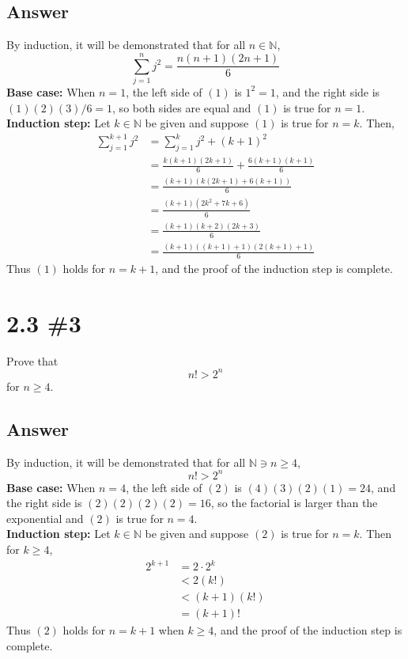 \documentclass[
	12pt, %
]{fphw}
\newcommand\qed{\text{$\blacksquare$}}
\newcommand\N{\mathbb{N}}
\begin{document}
\subsection*{Answer} By induction, it will be demonstrated that for all $n \in \N{}$,
\begin{equation} \label{eq1}
\sum_{j = 1}^n j^2 = \frac{n(n+1)(2n+1)}{6}
\end{equation}
\textbf{Base case:} When $n = 1$, the left side of $(1)$ is $1^2 = 1$, and the right side is $(1)(2)(3)/6 = 1$, so both sides are equal and $(1)$ is true for $n=1$.\\
\textbf{Induction step:} Let $k \in \N{}$ be given and suppose $(1)$ is true for $n = k$. Then,
\begin{align*}
\sum_{j = 1}^{k+1} j^2 &= \sum_{j = 1}^{k} j^2 + (k + 1)^2\\
&=\frac{k(k+1)(2k+1)}{6} + \frac{6(k + 1)(k + 1)}{6}\\
&=\frac{(k+1)(k(2k+1)+6(k+1))}{6}\\
&=\frac{(k+1)(2k^2+7k + 6)}{6}\\
&=\frac{(k+1)(k+2)(2k+3)}{6}\\
&=\frac{(k+1)((k+1)+1)(2(k+1) + 1)}{6}
\end{align*}
Thus $(1)$ holds for $n = k + 1$, and the proof of the induction step is complete. \qed
\newpage
\section*{2.3 \#3}

\begin{problem}
Prove that
$$
n! > 2^n
$$
for $n \ge 4$.
\end{problem}


\subsection*{Answer} By induction, it will be demonstrated that for all $\N{} \ni n \ge 4$,
\begin{equation} \label{eq1}
n! > 2^n
\end{equation}
\textbf{Base case:} When $n = 4$, the left side of $(2)$ is $(4)(3)(2)(1) = 24$, and the right side is $(2)(2)(2)(2) = 16$, so the factorial is larger than the exponential and $(2)$ is true for $n=4$.\\
\textbf{Induction step:} Let $k \in \N{}$ be given and suppose $(2)$ is true for $n = k$. Then for $k \ge 4$,
\begin{align*}
2^{k+1} &= 2 \cdot 2^k\\
&< 2(k!)\\
&< (k+1)(k!)\\
&= (k+1)!
\end{align*}
Thus $(2)$ holds for $n = k + 1$ when $k \ge 4$, and the proof of the induction step is complete. \qed
\end{document}

